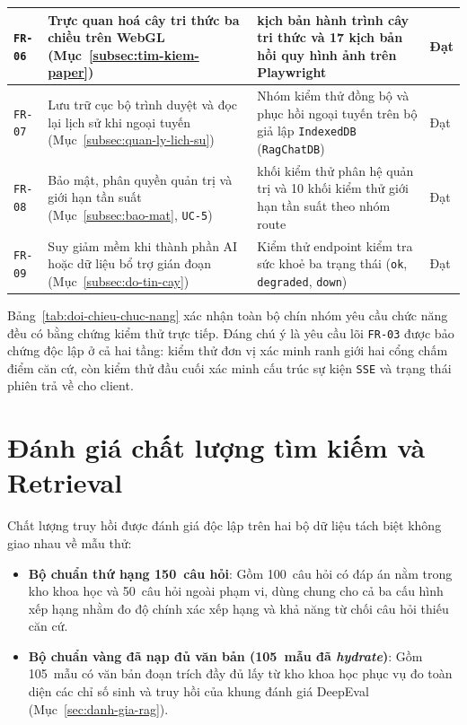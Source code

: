 \begin{table}[htbp]
\begin{tabularx}{\textwidth}{
  >{\raggedright\arraybackslash}p{1.6cm}
  >{\raggedright\arraybackslash}p{4.5cm}
  >{\raggedright\arraybackslash}X
  >{\raggedright\arraybackslash}p{1.6cm}
}
\midrule
\texttt{FR-06} & Trực quan hoá cây tri thức ba chiều trên WebGL (Mục~\ref{subsec:tim-kiem-paper}) & 7 kịch bản hành trình cây tri thức và 17 kịch bản hồi quy hình ảnh trên Playwright & Đạt \\
\midrule
\texttt{FR-07} & Lưu trữ cục bộ trình duyệt và đọc lại lịch sử khi ngoại tuyến (Mục~\ref{subsec:quan-ly-lich-su}) & Nhóm kiểm thử đồng bộ và phục hồi ngoại tuyến trên bộ giả lập \texttt{IndexedDB} (\texttt{RagChatDB}) & Đạt \\
\midrule
\texttt{FR-08} & Bảo mật, phân quyền quản trị và giới hạn tần suất (Mục~\ref{subsec:bao-mat}, \texttt{UC-5}) & 30 khối kiểm thử phân hệ quản trị và 10 khối kiểm thử giới hạn tần suất theo nhóm route & Đạt \\
\midrule
\texttt{FR-09} & Suy giảm mềm khi thành phần AI hoặc dữ liệu bổ trợ gián đoạn (Mục~\ref{subsec:do-tin-cay}) & Kiểm thử endpoint kiểm tra sức khoẻ ba trạng thái (\texttt{ok}, \texttt{degraded}, \texttt{down}) & Đạt \\
\bottomrule
\end{tabularx}
\end{table}

Bảng~\ref{tab:doi-chieu-chuc-nang} xác nhận toàn bộ chín nhóm yêu cầu chức năng đều có bằng chứng kiểm thử trực tiếp. Đáng chú ý là yêu cầu lõi \texttt{FR-03} được bảo chứng độc lập ở cả hai tầng: kiểm thử đơn vị xác minh ranh giới hai cổng chấm điểm căn cứ, còn kiểm thử đầu cuối xác minh cấu trúc sự kiện \texttt{SSE} và trạng thái phiên trả về cho client.

\section{Đánh giá chất lượng tìm kiếm và Retrieval}
\label{sec:danh-gia-retrieval}

Chất lượng truy hồi được đánh giá độc lập trên hai bộ dữ liệu tách biệt không giao nhau về mẫu thử:

\begin{itemize}
\item[--] \textbf{Bộ chuẩn thứ hạng 150~câu hỏi}: Gồm 100~câu hỏi có đáp án nằm trong kho khoa học và 50~câu hỏi ngoài phạm vi, dùng chung cho cả ba cấu hình xếp hạng nhằm đo độ chính xác xếp hạng và khả năng từ chối câu hỏi thiếu căn cứ.
\item[--] \textbf{Bộ chuẩn vàng đã nạp đủ văn bản (105~mẫu đã \textit{hydrate})}: Gồm 105~mẫu có văn bản đoạn trích đầy đủ lấy từ kho khoa học phục vụ đo toàn diện các chỉ số sinh và truy hồi của khung đánh giá DeepEval (Mục~\ref{sec:danh-gia-rag}).
\end{itemize}

